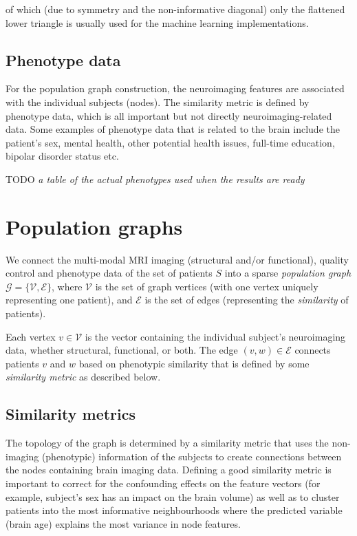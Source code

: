 of which (due to symmetry and the non-informative diagonal) only the flattened lower triangle is usually used for the machine learning implementations.

\subsection{Phenotype data}
For the population graph construction, the neuroimaging features are associated with the individual subjects (nodes). The similarity metric is defined by phenotype data, which is all important but not directly neuroimaging-related data. Some examples of phenotype data that is related to the brain include the patient's sex, mental health, other potential health issues, full-time education, bipolar disorder status etc. 


TODO \textit{a table of the actual phenotypes used when the results are ready}

\section{Population graphs}
\label{population-graphs}

We connect the multi-modal MRI imaging (structural and/or functional), quality control and phenotype data of the set of patients $S$ into a sparse \textit{population graph} $\mathcal{G} = \{\mathcal{V}, \mathcal{E}\}$, where $\mathcal{V}$ is the set of graph vertices (with one vertex uniquely representing one patient), and $\mathcal{E}$ is the set of edges (representing the \textit{similarity} of patients).

Each vertex $v \in \mathcal{V}$ is the vector containing the individual subject's neuroimaging data, whether structural, functional, or both. The edge $(v, w) \in \mathcal{E}$ connects patients $v$ and $w$ based on phenotypic similarity that is defined by some \textit{similarity metric} as described below.

\subsection{Similarity metrics}
The topology of the graph is determined by a similarity metric that uses the non-imaging (phenotypic) information of the subjects to create connections between the nodes containing brain imaging data. Defining a good similarity metric is important to correct for the confounding effects on the feature vectors (for example, subject's sex has an impact on the brain volume) as well as to cluster patients into the most informative neighbourhoods where the predicted variable (brain age) explains the most variance in node features.

